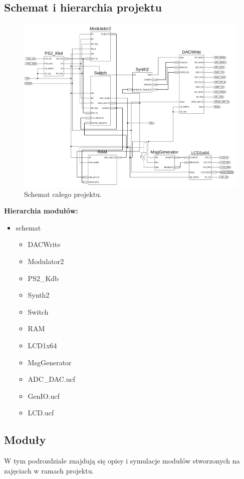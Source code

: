 \documentclass[a4paper,11pt]{article}
\begin{document}
\subsection{Schemat i hierarchia projektu}
\begin{figure}[H]
\center
\includegraphics[scale=0.35]{schemat.png}
\caption{Schemat całego projektu.}
\end{figure}
\textbf{Hierarchia modułów:}
\begin{itemize}
\item schemat
\begin{itemize}
\item DACWrite
\item Modulator2
\item PS2_Kdb
\item Synth2
\item Switch
\item RAM
\item LCD1x64
\item MsgGenerator
\item ADC_DAC.ucf
\item GenIO.ucf
\item LCD.ucf
\end{itemize}
\end{itemize}

\subsection{Moduły}
W tym podrozdziale znajdują się opisy i symulacje modułów stworzonych na zajęciach w ramach projektu.
\end{document}
